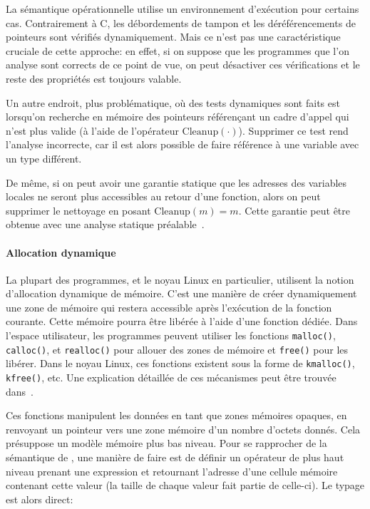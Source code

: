 La sémantique opérationnelle utilise un environnement d'exécution pour certains
cas. Contrairement à C, les débordements de tampon et les déréférencements de
pointeurs sont vérifiés dynamiquement. Mais ce n'est pas une caractéristique
cruciale de cette approche: en effet, si on suppose que les programmes que l'on
analyse sont corrects de ce point de vue, on peut désactiver ces vérifications
et le reste des propriétés est toujours valable.

Un autre endroit, plus problématique, où des tests dynamiques sont faits est
lorsqu'on recherche en mémoire des pointeurs référençant un cadre d'appel qui
n'est plus valide (à l'aide de l'opérateur $\mathrm{Cleanup}(\cdot)$). Supprimer
ce test rend l'analyse incorrecte, car il est alors possible de faire référence
à une variable avec un type différent.

De même, si on peut avoir une garantie statique que les adresses des variables
locales ne seront plus accessibles au retour d'une fonction, alors on peut
supprimer le nettoyage en posant $\mathrm{Cleanup}(m) = m$. Cette garantie peut
être obtenue avec une analyse statique préalable~\cite{ifm10}.

\paragraph{Allocation dynamique}

La plupart des programmes, et le noyau Linux en particulier, utilisent la notion
d'allocation dynamique de mémoire. C'est une manière de créer dynamiquement une
zone de mémoire qui restera accessible après l'exécution de la fonction
courante. Cette mémoire pourra être libérée à l'aide d'une fonction dédiée. Dans
l'espace utilisateur, les programmes peuvent utiliser les fonctions
\verb!malloc()!, \verb!calloc()!, et \verb!realloc()! pour allouer des zones de
mémoire et \verb!free()! pour les libérer. Dans le noyau Linux, ces fonctions
existent sous la forme de \verb!kmalloc()!, \verb!kfree()!, etc. Une explication
détaillée de ces mécanismes peut être trouvée dans~\cite{LinuxVMM}.

Ces fonctions manipulent les données en tant que zones mémoires opaques, en
renvoyant un pointeur vers une zone mémoire d'un nombre d'octets donnés. Cela
présuppose un modèle mémoire plus bas niveau. Pour se rapprocher de la
sémantique de \langname, une manière de faire est de définir un opérateur de
plus haut niveau prenant une expression et retournant l'adresse d'une cellule
mémoire contenant cette valeur (la taille de chaque valeur fait partie de
celle-ci). Le typage est alors direct:


